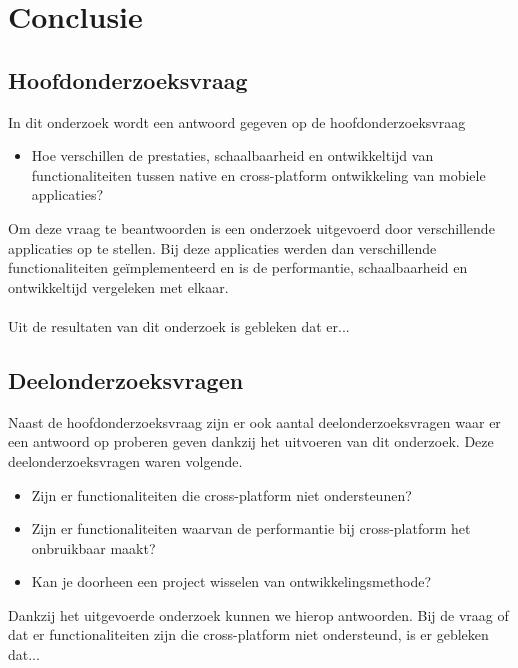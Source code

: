 
\chapter{Conclusie}%
\label{ch:conclusie}


\section{Hoofdonderzoeksvraag}
In dit onderzoek wordt een antwoord gegeven op de hoofdonderzoeksvraag 
\begin{itemize}
    \item Hoe verschillen de prestaties, schaalbaarheid en ontwikkeltijd van functionaliteiten tussen native en cross-platform ontwikkeling van mobiele applicaties?
\end{itemize}
Om deze vraag te beantwoorden is een onderzoek uitgevoerd door verschillende applicaties op te stellen. 
Bij deze applicaties werden dan verschillende functionaliteiten geïmplementeerd en is de performantie, 
schaalbaarheid en ontwikkeltijd vergeleken met elkaar. 
\\\\
Uit de resultaten van dit onderzoek is gebleken dat er...


\section{Deelonderzoeksvragen}
Naast de hoofdonderzoeksvraag zijn er ook aantal deelonderzoeksvragen waar er een antwoord op proberen 
geven dankzij het uitvoeren van dit onderzoek. 
Deze deelonderzoeksvragen waren volgende.
\begin{itemize}
    \item Zijn er functionaliteiten die cross-platform niet ondersteunen?
    \item Zijn er functionaliteiten waarvan de performantie bij cross-platform het onbruikbaar maakt?
    \item Kan je doorheen een project wisselen van ontwikkelingsmethode?
\end{itemize}
Dankzij het uitgevoerde onderzoek kunnen we hierop antwoorden. Bij de vraag of dat er 
functionaliteiten zijn die cross-platform niet ondersteund, 
is er gebleken dat...

